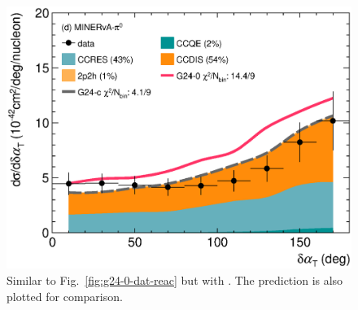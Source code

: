 \begin{figure}
    \includegraphics[width=\dbfigwid\textwidth]{figures/0026-min_pi0_dalphat_reac_decomp.eps}
    \caption{\label{fig:g24-c-dat-reac} 
    Similar to Fig.~\ref{fig:g24-0-dat-reac} but with \gC.  The \gZero prediction is also plotted for comparison. 
    } 


\end{figure}
